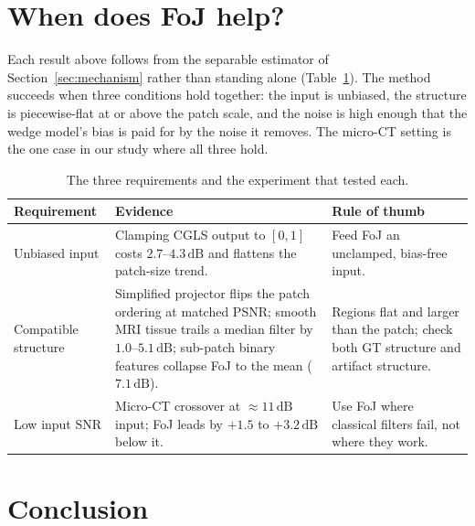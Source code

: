 \documentclass[11pt]{article}
\newcommand{\dB}{\,\mathrm{dB}}
\begin{document}
\section{When does FoJ help?}

Each result above follows from the separable estimator of
Section~\ref{sec:mechanism} rather than standing alone
(Table~\ref{tab:factors}). The method succeeds when three conditions
hold together: the input is unbiased, the structure is piecewise-flat at
or above the patch scale, and the noise is high enough that the wedge
model's bias is paid for by the noise it removes. The micro-CT setting
is the one case in our study where all three hold.

\begin{table}[h]
\centering\small
\caption{The three requirements and the experiment that tested each.}
\label{tab:factors}
\begin{tabular}{>{\raggedright\arraybackslash}p{3.2cm}>{\raggedright\arraybackslash}p{5.7cm}>{\raggedright\arraybackslash}p{5.7cm}}
\toprule
Requirement & Evidence & Rule of thumb \\
\midrule
Unbiased input &
Clamping CGLS output to $[0,1]$ costs $2.7$--$4.3\dB$ and flattens the
patch-size trend. &
Feed FoJ an unclamped, bias-free input. \\[4pt]
Compatible structure &
Simplified projector flips the patch ordering at matched PSNR; smooth MRI
tissue trails a median filter by $1.0$--$5.1\dB$; sub-patch binary
features collapse FoJ to the mean ($7.1\dB$). &
Regions flat and larger than the patch; check both GT structure and
artifact structure. \\[4pt]
Low input SNR &
Micro-CT crossover at ${\approx}11\dB$ input; FoJ leads by $+1.5$ to
$+3.2\dB$ below it. &
Use FoJ where classical filters fail, not where they work. \\
\bottomrule
\end{tabular}
\end{table}

\section{Conclusion}
\end{document}
